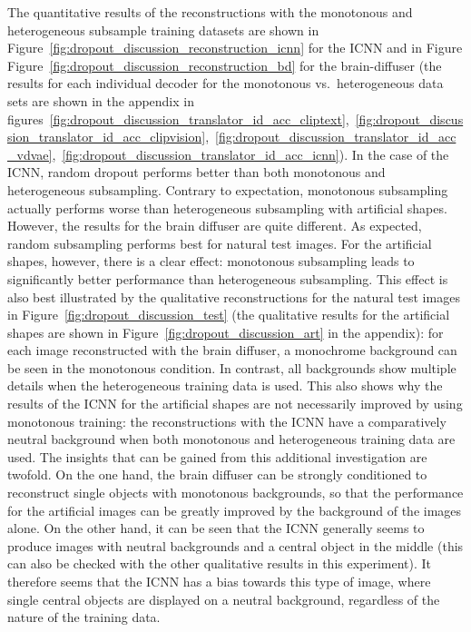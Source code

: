 The quantitative results of the reconstructions with the monotonous and heterogeneous subsample training datasets are shown in Figure~\ref{fig:dropout_discussion_reconstruction_icnn} for the ICNN and in Figure Figure~\ref{fig:dropout_discussion_reconstruction_bd} for the brain-diffuser (the results for each individual decoder for the monotonous vs.\ heterogeneous data sets are shown in the appendix in figures~\ref{fig:dropout_discussion_translator_id_acc_cliptext},~\ref{fig:dropout_discussion_translator_id_acc_clipvision},~\ref{fig:dropout_discussion_translator_id_acc_vdvae},~\ref{fig:dropout_discussion_translator_id_acc_icnn}). In the case of the ICNN, random dropout performs better than both monotonous and heterogeneous subsampling. Contrary to expectation, monotonous subsampling actually performs worse than heterogeneous subsampling with artificial shapes. However, the results for the brain diffuser are quite different. As expected, random subsampling performs best for natural test images. For the artificial shapes, however, there is a clear effect: monotonous subsampling leads to significantly better performance than heterogeneous subsampling. This effect is also best illustrated by the qualitative reconstructions for the natural test images in Figure~\ref{fig:dropout_discussion_test} (the qualitative results for the artificial shapes are shown in Figure~\ref{fig:dropout_discussion_art} in the appendix): for each image reconstructed with the brain diffuser, a monochrome background can be seen in the monotonous condition. In contrast, all backgrounds show multiple details when the heterogeneous training data is used. This also shows why the results of the ICNN for the artificial shapes are not necessarily improved by using monotonous training: the reconstructions with the ICNN have a comparatively neutral background when both monotonous and heterogeneous training data are used. The insights that can be gained from this additional investigation are twofold. On the one hand, the brain diffuser can be strongly conditioned to reconstruct single objects with monotonous backgrounds, so that the performance for the artificial images can be greatly improved by the background of the images alone. On the other hand, it can be seen that the ICNN generally seems to produce images with neutral backgrounds and a central object in the middle (this can also be checked with the other qualitative results in this experiment). It therefore seems that the ICNN has a bias towards this type of image, where single central objects are displayed on a neutral background, regardless of the nature of the training data. 

